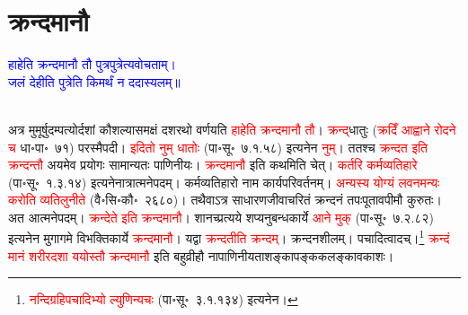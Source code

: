\section[क्रन्दमानौ]{क्रन्दमानौ}
\centering\textcolor{blue}{हाहेति क्रन्दमानौ तौ पुत्रपुत्रेत्यवोचताम्।\nopagebreak\\
जलं देहीति पुत्रेति किमर्थं न ददास्यलम्॥}\nopagebreak\\
\\
\begin{sloppypar}\justifying\noindent\hspace{10mm} अत्र मुमूर्षु\-दम्पत्योर्दशां कौशल्या\-समक्षं दशरथो वर्णयति \textcolor{red}{हाहेति क्रन्दमानौ तौ}। \textcolor{red}{क्रन्द्‌}\-धातुः (\textcolor{red}{क्रदिँ आह्वाने रोदने च} धा॰पा॰~७१) परस्मैपदी। \textcolor{red}{इदितो नुम् धातोः} (पा॰सू॰~७.१.५८) इत्यनेन \textcolor{red}{नुम्}। ततश्च \textcolor{red}{क्रन्दत इति क्रन्दन्तौ} अयमेव प्रयोगः सामान्यतः पाणिनीयः। \textcolor{red}{क्रन्दमानौ} इति कथमिति चेत्। \textcolor{red}{कर्तरि कर्म\-व्यतिहारे} (पा॰सू॰~१.३.१४) इत्यनेनात्रात्मनेपदम्। कर्म\-व्यतिहारो नाम कार्य\-परिवर्तनम्। \textcolor{red}{अन्यस्य योग्यं लवनमन्यः करोति व्यतिलुनीते} (वै॰सि॰कौ॰~२६८०)। तथैवाऽत्र साधारण\-जीवाचरितं क्रन्दनं तपःपूतावपीमौ कुरुतः। अत आत्मनेपदम्। \textcolor{red}{क्रन्देते इति क्रन्दमानौ}। शानच्प्रत्यये शप्यनुबन्ध\-कार्ये \textcolor{red}{आने मुक्} (पा॰सू॰~७.२.८२) इत्यनेन मुगागमे विभक्ति\-कार्ये \textcolor{red}{क्रन्दमानौ}। यद्वा \textcolor{red}{क्रन्दतीति क्रन्दम्}। क्रन्दनशीलम्। पचादित्वादच्।\footnote{\textcolor{red}{नन्दि\-ग्रहि\-पचादिभ्यो ल्युणिन्यचः} (पा॰सू॰~३.१.१३४) इत्यनेन।} \textcolor{red}{क्रन्दं मानं शरीर\-दशा ययोस्तौ क्रन्दमानौ} इति बहुव्रीहौ नापाणिनीयता\-शङ्का\-पङ्क\-कलङ्कावकाशः।\end{sloppypar}
